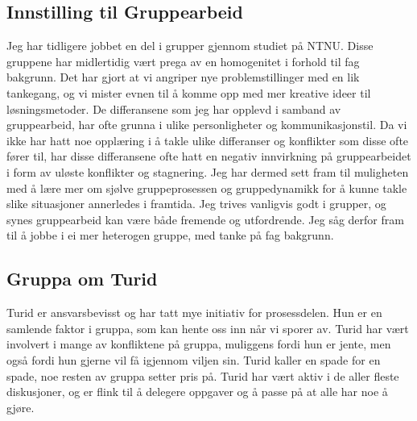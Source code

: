 \subsection*{Innstilling til Gruppearbeid}
Jeg har tidligere jobbet en del i grupper gjennom studiet på NTNU. Disse gruppene har midlertidig vært prega av en homogenitet i forhold til fag bakgrunn. Det har gjort at vi angriper nye problemstillinger med en lik tankegang, og vi mister evnen til å komme opp med mer kreative ideer til løsningsmetoder. De differansene som jeg har opplevd i samband av gruppearbeid, har ofte grunna i ulike personligheter og kommunikasjonstil. Da vi ikke har hatt noe opplæring i å takle ulike differanser og konflikter som disse ofte fører til, har disse differansene ofte hatt en negativ innvirkning på gruppearbeidet i form av uløste konflikter og stagnering. Jeg har dermed sett fram til muligheten med å lære mer om sjølve gruppeprosessen og gruppedynamikk for å kunne takle slike situasjoner annerledes i framtida. Jeg trives vanligvis godt i grupper, og synes gruppearbeid kan være både fremende og utfordrende.  Jeg såg derfor fram til å jobbe i ei mer heterogen gruppe, med tanke på fag bakgrunn.


%

\subsection*{Gruppa om Turid}
Turid er ansvarsbevisst og har tatt mye initiativ for prosessdelen. Hun er en
samlende faktor i gruppa, som kan hente oss inn når vi sporer av. Turid har vært
involvert i mange av konfliktene på gruppa, muliggens fordi hun er jente,
men også fordi hun gjerne vil få igjennom viljen sin. Turid kaller en spade for
en spade, noe resten av gruppa setter pris på. Turid har vært aktiv i de aller
fleste diskusjoner, og er flink til å delegere oppgaver og å passe på at alle
har noe å gjøre.

